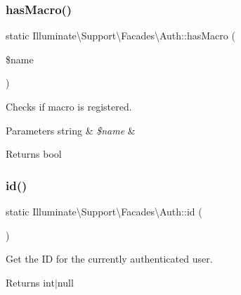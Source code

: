 \subsubsection{\texorpdfstring{has\+Macro()}{hasMacro()}}
{\footnotesize\ttfamily static Illuminate\textbackslash{}\+Support\textbackslash{}\+Facades\textbackslash{}\+Auth\+::has\+Macro (\begin{DoxyParamCaption}\item[{}]{\$name }\end{DoxyParamCaption})\hspace{0.3cm}{\ttfamily [static]}}

Checks if macro is registered.


\begin{DoxyParams}[1]{Parameters}
string & {\em \$name} & \\
\hline
\end{DoxyParams}
\begin{DoxyReturn}{Returns}
bool 
\end{DoxyReturn}
\mbox{\label{class_illuminate_1_1_support_1_1_facades_1_1_auth_ab98365becdcd81b76d4be5aaa6971a05}} 
\subsubsection{\texorpdfstring{id()}{id()}}
{\footnotesize\ttfamily static Illuminate\textbackslash{}\+Support\textbackslash{}\+Facades\textbackslash{}\+Auth\+::id (\begin{DoxyParamCaption}{ }\end{DoxyParamCaption})\hspace{0.3cm}{\ttfamily [static]}}

Get the ID for the currently authenticated user.

\begin{DoxyReturn}{Returns}
int$\vert$null 
\end{DoxyReturn}
\mbox{\label{class_illuminate_1_1_support_1_1_facades_1_1_auth_aeef81e7eab1a76858dfa1b5e2d251bf0}} 
